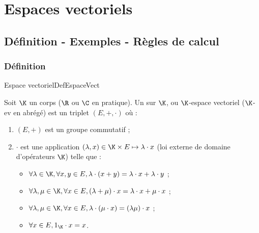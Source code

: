 \documentclass[12pt, a4paper]{report}
\begin{document}
\chapter{Espaces vectoriels}

\section{Définition - Exemples - Règles de calcul}


\subsection{Définition}

\begin{definition}{Espace vectoriel}{DefEspaceVect}

Soit $\K$ un corps ($\R$ ou $\C$ en pratique). Un  sur $\K$, ou $\K$-espace vectoriel ($\K$-ev en abrégé) est un triplet $(E,+,\cdot)$ où :

\begin{enumerate}

	\item $(E,+)$ est un groupe commutatif ;
	
	\item $\cdot$ est une application $(\lambda,x) \in \K \times E \mapsto \lambda \cdot x$ (loi externe de domaine d'opérateurs $\K$) telle que :
	
	\begin{itemize}
		\item $\forall \lambda \in \K, \forall x,y \in E, \lambda \cdot (x+y) = \lambda \cdot x + \lambda \cdot y$ ;
		
		\item $\forall \lambda, \mu \in \K, \forall x \in E, (\lambda + \mu) \cdot x = \lambda \cdot x + \mu \cdot x$ ;
		
		\item $\forall \lambda, \mu \in \K, \forall x \in E, \lambda \cdot (\mu \cdot x) = (\lambda \mu) \cdot x$ ;
		
		\item $\forall x \in E, 1_\K \cdot x = x$.
	\end{itemize}
	
\end{enumerate}

\end{definition}
\end{document}
